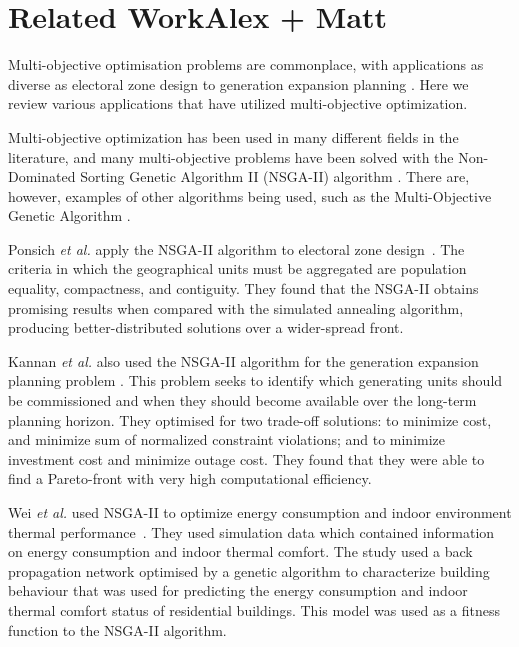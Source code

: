 \documentclass[10pt, conference, compsocconf]{IEEEtran}
\begin{document}
\section{Related Work{\color{red}Alex + Matt}}
\label{relatedWork}

Multi-objective optimisation problems are commonplace, with applications as diverse as electoral zone design \cite{Ponsich2017} to generation expansion planning \cite{Kannan2009}. Here we review various applications that have utilized multi-objective optimization.

Multi-objective optimization has been used in many different fields in the literature, and many multi-objective problems have been solved with the Non-Dominated Sorting Genetic Algorithm II (NSGA-II) algorithm \cite{Valkanas2014}. There are, however, examples of other algorithms being used, such as the Multi-Objective Genetic Algorithm \cite{T.MurataandH.Ishibuchi1995}.

Ponsich \textit{et al.} apply the NSGA-II algorithm to electoral zone design~\cite{Ponsich2017}. The criteria in which the geographical units must be aggregated are population equality, compactness, and contiguity. They found that the NSGA-II obtains promising results when compared with the simulated annealing algorithm, producing better-distributed solutions over a wider-spread front.

Kannan \textit{et al.} also used the NSGA-II algorithm for the generation expansion planning problem  \cite{Kannan2009}. This problem seeks to identify which generating units should be commissioned and when they should become available over the long-term planning horizon. They optimised for two trade-off solutions: to minimize cost, and minimize sum of normalized constraint violations; and to minimize investment cost and minimize outage cost. They found that they were able to find a Pareto-front with very high computational efficiency.

Wei \textit{et al.} used NSGA-II to optimize energy consumption and indoor environment thermal performance~\cite{Yu2015a}. They used simulation data which contained information on energy consumption and indoor thermal comfort. The study used a back propagation network optimised by a genetic algorithm to characterize building behaviour that was used for predicting the energy consumption and indoor thermal comfort status of residential buildings. This model was used as a fitness function to the NSGA-II algorithm.
\end{document}
